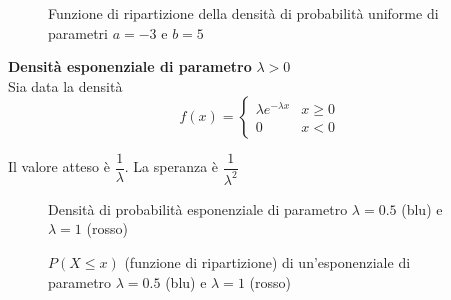 \begin{defn}
\begin{figure}[htbp]
        \caption{Funzione di ripartizione della densità di probabilità uniforme di parametri $a = -3$ e $b = 5$}
        \label{uniformpart}
    \end{figure}

\end{defn}

\begin{defn}
    \textbf{Densità esponenziale di parametro} $ \lambda > 0 $ \\
    Sia data la densità
    \begin{equation*}
        f(x) = \begin{cases}
            \lambda e^{-\lambda x} & x \geq 0 \\
            0 & x < 0
        \end{cases}
    \end{equation*}

    Il valore atteso è $ \dfrac{1}{\lambda} $. La speranza è
    $\dfrac{1}{\lambda^2}$

    \begin{figure}[htbp]
        \centering

        \caption{Densità di probabilità esponenziale di parametro $\lambda = 0.5$ (blu) e $\lambda = 1$ (rosso)}
        \label{exparam}
    \end{figure}

    \begin{figure}[htbp]
        \centering

        \caption{$P(X \leq x)$ (funzione di ripartizione) di un'esponenziale di parametro $\lambda = 0.5$ (blu) e $\lambda = 1$ (rosso)}
        \label{exparam2}
    \end{figure}


\end{defn}

